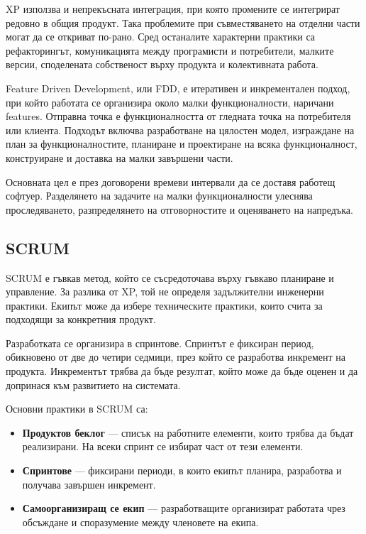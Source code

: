 XP използва и непрекъсната интеграция, при която промените се интегрират редовно в общия продукт. Така проблемите при съвместяването на отделни части могат да се откриват по-рано. Сред останалите характерни практики са рефакторингът, комуникацията между програмисти и потребители, малките версии, споделената собственост върху продукта и колективната работа.

Feature Driven Development, или FDD, е итеративен и инкрементален подход, при който работата се организира около малки функционалности, наричани features. Отправна точка е функционалността от гледната точка на потребителя или клиента. Подходът включва разработване на цялостен модел, изграждане на план за функционалностите, планиране и проектиране на всяка функционалност, конструиране и доставка на малки завършени части.

Основната цел е през договорени времеви интервали да се доставя работещ софтуер. Разделянето на задачите на малки функционалности улеснява проследяването, разпределянето на отговорностите и оценяването на напредъка.

\subsection{SCRUM}\label{s:26.4.2}

\begin{defn}[Scrum]
SCRUM е гъвкав метод, който се съсредоточава върху гъвкаво планиране и управление. За разлика от XP, той не определя задължителни инженерни практики. Екипът може да избере техническите практики, които счита за подходящи за конкретния продукт.
\end{defn}

Разработката се организира в спринтове. Спринтът е фиксиран период, обикновено от две до четири седмици, през който се разработва инкремент на продукта. Инкрементът трябва да бъде резултат, който може да бъде оценен и да допринася към развитието на системата.

Основни практики в SCRUM са:

\begin{itemize}
    \item \textbf{Продуктов беклог} --- списък на работните елементи, които трябва да бъдат реализирани. На всеки спринт се избират част от тези елементи.
    \item \textbf{Спринтове} --- фиксирани периоди, в които екипът планира, разработва и получава завършен инкремент.
    \item \textbf{Самоорганизиращ се екип} --- разработващите организират работата чрез обсъждане и споразумение между членовете на екипа.
\end{itemize}


